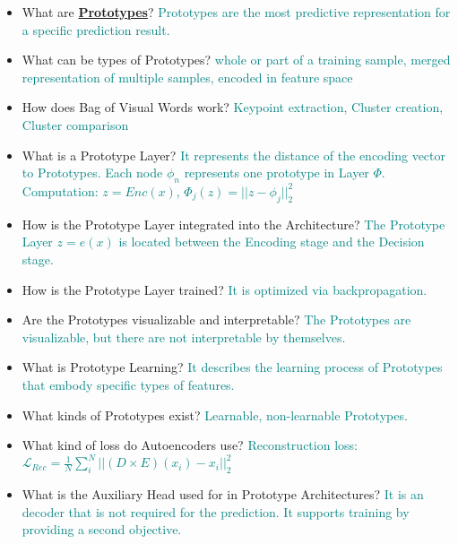\documentclass{report}
\newcommand{\asw}[2][teal]{}
\renewcommand{\asw}[2][teal]{\textcolor{#1}{#2}}
\begin{document}
	\begin{itemize}
	\item What are \textbf{\underline{Prototypes}}?
	\asw{\newline Prototypes are the most predictive representation for a specific prediction result.}
	\item What can be types of Prototypes?
	\asw{\newline whole or part of a training sample, merged representation of multiple samples, encoded in feature space}
	\item How does Bag of Visual Words work?
	\asw{\newline Keypoint extraction, Cluster creation, Cluster comparison}
	\item What is a Prototype Layer?
	\asw{\newline It represents the distance of the encoding vector to Prototypes. Each node $\phi_n$ represents one prototype in Layer $\Phi$.
		\newline Computation: $z = Enc(x)$, $\Phi_j(z) = ||z - \phi_j||^2_2$}
	\item How is the Prototype Layer integrated into the Architecture?
	\asw{\newline The Prototype Layer $z = e(x)$ is located between the Encoding stage and the Decision stage.}
	\item How is the Prototype Layer trained?
	\asw{\newline It is optimized via backpropagation.}
	\item Are the Prototypes visualizable and interpretable?
	\asw{\newline The Prototypes are visualizable, but there are not interpretable by themselves.}
	\item What is Prototype Learning?
	\asw{\newline It describes the learning process of Prototypes that embody specific types of features.}
	\item What kinds of Prototypes exist?
	\asw{\newline Learnable, non-learnable Prototypes.}
	\item What kind of loss do Autoencoders use?
	\asw{\newline Reconstruction loss: $\mathcal{L}_{Rec} = \frac{1}{N} \sum_{i}^{N} ||(D \times E)(x_i) - x_i||^2_2$}
	\item What is the Auxiliary Head used for in Prototype Architectures?
	\asw{\newline It is an decoder that is not required for the prediction. It supports training by providing a second objective.}

\end{itemize}
\end{document}
